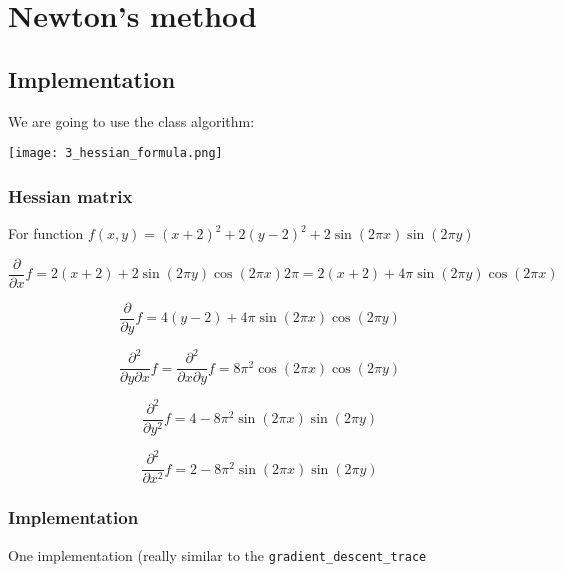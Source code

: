 \section{Newton's method}

\subsection{Implementation}


We are going to use the class algorithm:


\texttt{[image: 3\_hessian\_formula.png]}

\subsubsection{Hessian matrix}

For function $f(x,y) = (x+2)^2 + 2(y-2)^2 + 2 \sin (2 \pi x) \sin (2 \pi y)$

\begin{equation*}
  \frac{\partial }{\partial x} f = 2 (x + 2) + 2 \sin (2 \pi y) \cos ( 2 \pi x) 2 \pi =  2 (x + 2) +  4 \pi \sin (2 \pi y) \cos ( 2 \pi x)   
\end{equation*}

\begin{equation*}
  \frac{\partial }{\partial y} f = 4 (y - 2) +  4 \pi \sin (2 \pi x) \cos ( 2 \pi y)   
\end{equation*}


\begin{equation*}
  \frac{\partial ^2 }{\partial y \partial x} f =  \frac{\partial ^2 }{\partial x \partial y } f =  8 \pi^2 \cos (2 \pi x) \cos ( 2 \pi y)   
\end{equation*}


\begin{equation*}
  \frac{\partial^2 }{\partial y^2} f = 4  -  8 \pi^2 \sin (2 \pi x) \sin ( 2 \pi y)   
\end{equation*}


\begin{equation*}
  \frac{\partial^2 }{\partial x^2} f = 2  -  8 \pi^2 \sin (2 \pi x) \sin ( 2 \pi y)   
\end{equation*}


\subsubsection{Implementation}

One implementation (really similar to the \texttt{gradient\_descent\_trace}

